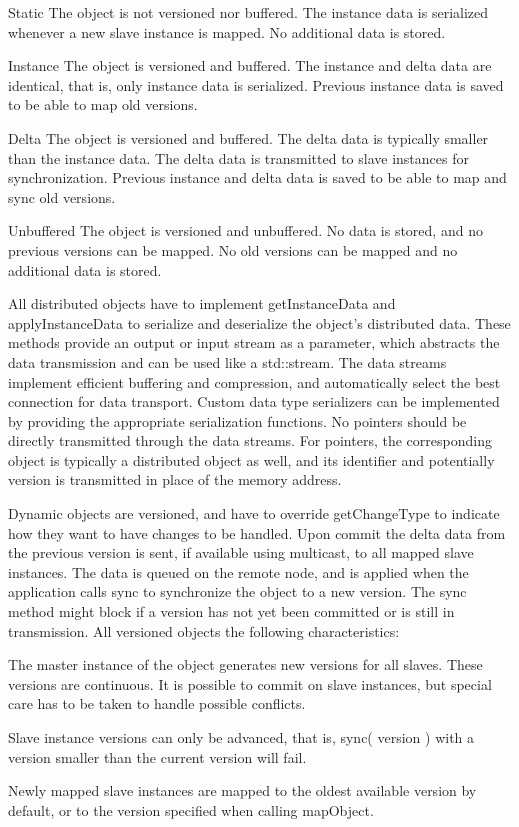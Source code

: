 \documentclass[10pt,journal,compsoc]{IEEEtran}
\begin{document}
\begin{compactdesc}
\item[Static] The object is not versioned nor buffered. The instance data is
  serialized whenever a new slave instance is mapped. No additional data is
  stored.
\item[Instance] The object is versioned and buffered. The instance and delta
  data are identical, that is, only instance data is serialized. Previous
  instance data is saved to be able to map old versions.
\item[Delta] The object is versioned and buffered. The delta data is typically
  smaller than the instance data. The delta data is transmitted to slave
  instances for synchronization. Previous instance and delta data is saved to be
  able to map and sync old versions.
\item[Unbuffered] The object is versioned and unbuffered. No data is stored, and
  no previous versions can be mapped. No old versions can be mapped and no
  additional data is stored.
\end{compactdesc}

All distributed objects have to implement \textsf{getInstanceData} and
\textsf{applyInstanceData} to serialize and deserialize the object's distributed
data. These methods provide an output or input stream as a parameter, which
abstracts the data transmission and can be used like a \textsf{std::stream}.
The data streams implement efficient buffering and compression, and
automatically select the best connection for data transport. Custom data type
serializers can be implemented by providing the appropriate serialization
functions. No pointers should be directly transmitted through the data
streams. For pointers, the corresponding object is typically a distributed
object as well, and its identifier and potentially version is transmitted in
place of the memory address.

Dynamic objects are versioned, and have to override \textsf{getChangeType} to
indicate how they want to have changes to be handled. Upon \textsf{commit} the
delta data from the previous version is sent, if available using multicast, to
all mapped slave instances. The data is queued on the remote node, and is
applied when the application calls \textsf{sync} to synchronize the object to a
new version. The \textsf{sync} method might block if a version has not yet been
committed or is still in transmission. All versioned objects the following
characteristics:

\begin{compactitem}
\item The master instance of the object generates new versions for all
  slaves. These versions are continuous. It is possible to commit on slave
  instances, but special care has to be taken to handle possible
  conflicts.
\item Slave instance versions can only be advanced, that is, \textsf{sync(
  version )} with a version smaller than the current version will fail.
\item Newly mapped slave instances are mapped to the oldest available
  version by default, or to the version specified when calling
  \textsf{mapObject}.
\end{compactitem}
\end{document}
